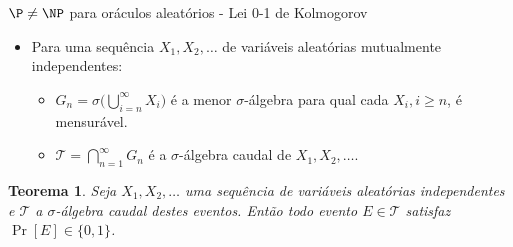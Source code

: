 \documentclass[landscape, 9pt]{beamer}
\newtheorem{teo}{Teorema}
\begin{document}
\begin{frame} {$\P \neq \NP$ para oráculos aleatórios - Lei 0-1 de Kolmogorov}

\begin{itemize}

	\item Para uma sequência $X_{1}, X_{2}, \dots$ de variáveis aleatórias mutualmente independentes:
	
	\begin{itemize}
	
		\item $G_{n} = \sigma \Big(\bigcup_{i = n}^{\infty} X_{i} \Big)$ é a menor $\sigma$-álgebra para qual cada $X_{i}, i \geq n$, é mensurável.
		
		\item $\mathcal{T} = \bigcap_{n = 1}^{\infty} G_{n}$ é a $\sigma$-álgebra caudal de $X_{1}, X_{2}, \dots$.
	
	\end{itemize}

\end{itemize}

\begin{teo}

Seja $X_{1}, X_{2}, \dots$ uma sequência de variáveis aleatórias independentes e $\mathcal{T}$ a $\sigma$-álgebra caudal destes eventos. Então todo evento $E \in \mathcal{T}$ satisfaz $\Pr[E] \in \{0, 1\}$.

\end{teo}

\end{frame}

\end{document}
